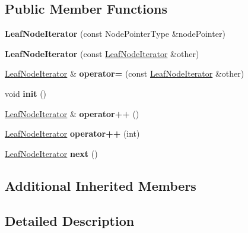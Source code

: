 \subsection*{Public Member Functions}
\begin{DoxyCompactItemize}
\item 
\mbox{\label{classLeafNodeIterator_a7058c0558f0aa82730a57e33a8595757}} 
{\bfseries Leaf\+Node\+Iterator} (const Node\+Pointer\+Type \&node\+Pointer)
\item 
\mbox{\label{classLeafNodeIterator_aac2412ca1a92b8f68523a146d84af8f8}} 
{\bfseries Leaf\+Node\+Iterator} (const \mbox{\hyperlink{classLeafNodeIterator}{Leaf\+Node\+Iterator}} \&other)
\item 
\mbox{\label{classLeafNodeIterator_a399ad7fc7b4783aca87f6e6a7860e274}} 
\mbox{\hyperlink{classLeafNodeIterator}{Leaf\+Node\+Iterator}} \& {\bfseries operator=} (const \mbox{\hyperlink{classLeafNodeIterator}{Leaf\+Node\+Iterator}} \&other)
\item 
\mbox{\label{classLeafNodeIterator_a3c5cf36859161bcbcbf8a17b20c3e28c}} 
void {\bfseries init} ()
\item 
\mbox{\label{classLeafNodeIterator_a596e8734fe2386fac0085669b3f49163}} 
\mbox{\hyperlink{classLeafNodeIterator}{Leaf\+Node\+Iterator}} \& {\bfseries operator++} ()
\item 
\mbox{\label{classLeafNodeIterator_a8ebeb7e9fa21cf5db7a0815e8e75c2d6}} 
\mbox{\hyperlink{classLeafNodeIterator}{Leaf\+Node\+Iterator}} {\bfseries operator++} (int)
\item 
\mbox{\label{classLeafNodeIterator_ab48e85ff356a95903618a66997b1dc9c}} 
\mbox{\hyperlink{classLeafNodeIterator}{Leaf\+Node\+Iterator}} {\bfseries next} ()
\end{DoxyCompactItemize}
\subsection*{Additional Inherited Members}


\subsection{Detailed Description}
